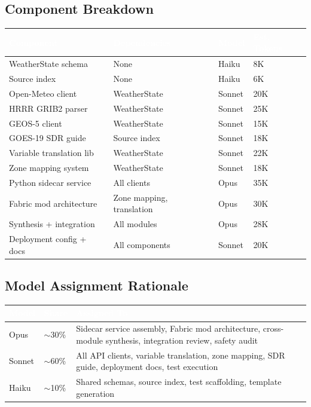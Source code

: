\documentclass[11pt,letterpaper]{article}
\newcommand{\tableheader}[1]{\textbf{\sffamily\textcolor{white}{#1}}}
\begin{document}
\subsection{Component Breakdown}

\begin{center}
\begin{tabularx}{\textwidth}{L{3cm}L{2.5cm}C{1.5cm}C{1.5cm}}
\toprule
{}
\tableheader{Component} & \tableheader{Dependencies} & \tableheader{Model} & \tableheader{Est. Tokens} \\
\midrule
WeatherState schema & None & Haiku & 8K \\
Source index & None & Haiku & 6K \\
Open-Meteo client & WeatherState & Sonnet & 20K \\
HRRR GRIB2 parser & WeatherState & Sonnet & 25K \\
GEOS-5 client & WeatherState & Sonnet & 15K \\
GOES-19 SDR guide & Source index & Sonnet & 18K \\
Variable translation lib & WeatherState & Sonnet & 22K \\
Zone mapping system & WeatherState & Sonnet & 18K \\
Python sidecar service & All clients & Opus & 35K \\
Fabric mod architecture & Zone mapping, translation & Opus & 30K \\
Synthesis + integration & All modules & Opus & 28K \\
Deployment config + docs & All components & Sonnet & 20K \\
\bottomrule
\end{tabularx}
\end{center}

\subsection{Model Assignment Rationale}

\begin{center}
\begin{tabularx}{\textwidth}{L{2cm}C{1.5cm}X}
\toprule
{}
\tableheader{Model} & \tableheader{Share} & \tableheader{Assigned To} \\
\midrule
Opus & $\sim$30\% & Sidecar service assembly, Fabric mod architecture, cross-module synthesis, integration review, safety audit \\
Sonnet & $\sim$60\% & All API clients, variable translation, zone mapping, SDR guide, deployment docs, test execution \\
Haiku & $\sim$10\% & Shared schemas, source index, test scaffolding, template generation \\
\bottomrule
\end{tabularx}
\end{center}
\end{document}
